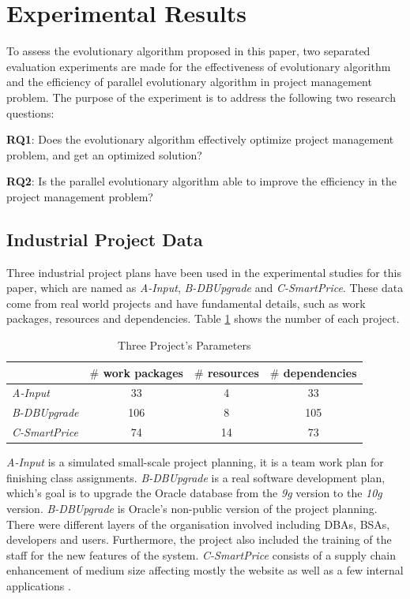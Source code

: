 %
%
\newcommand{\projectA}[0]{\emph{A-Input}}
\newcommand{\projectB}[0]{\emph{B-DBUpgrade}}
\newcommand{\projectC}[0]{\emph{C-SmartPrice}}

\section{Experimental Results}
%
To assess the evolutionary algorithm proposed in this paper, two separated
evaluation experiments are made for the effectiveness of evolutionary algorithm
and the efficiency of parallel evolutionary algorithm in project management
problem. The purpose of the experiment is to address the following two
research questions:

\textbf{RQ1}: Does the evolutionary algorithm effectively optimize project
management problem, and get an optimized solution?

\textbf{RQ2}: Is the parallel evolutionary algorithm able to improve the
efficiency in the project management problem?


\subsection{Industrial Project Data}
%
Three industrial project plans have been used in the experimental studies for
this paper, which are named as \projectA{}, \projectB{} and \projectC{}. These
data come from real world projects and have fundamental details, such as work
packages, resources and dependencies. Table \ref{tab:statis} shows the number of
each project.

% 
\begin{table}[!h]
  \centering
  \caption{Three Project's Parameters}
  \label{tab:statis}
  \begin{tabular}{lccc}
    \hline
      & $\#$ work packages & $\#$ resources & $\#$ dependencies \\
    \hline
    \projectA{} & 33  & 4  & 33  \\
    \projectB{} & 106 & 8  & 105 \\
    \projectC{} & 74  & 14 & 73  \\
    \hline
  \end{tabular}
\end{table}

\projectA{} is a simulated small-scale project planning, it is a team work plan
for finishing class assignments. \projectB{} is a real software development
plan, which's goal is to upgrade the Oracle database from the \emph{9g} version
to the \emph{10g} version. \projectB{} is Oracle's non-public version of the
project planning. There were different layers of the organisation involved
including DBAs, BSAs, developers and users.  Furthermore, the project also
included the training of the staff for the new features of the
system. \projectC{} consists of a supply chain enhancement of medium size
affecting mostly the website as well as a few internal applications \cite{ren2}.

